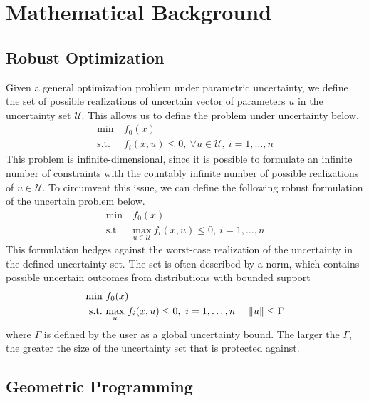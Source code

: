 \section{Mathematical Background}

\subsection{Robust Optimization}

Given a general optimization problem under parametric uncertainty, we define the set of possible
realizations of uncertain vector of parameters $u$ in the uncertainty set $\mathcal{U}$. This
allows us to define the problem under uncertainty below.
\begin{align*}
    \text{min} &~f_0(x) \\
    \text{s.t.}     &~f_i(x,u) \leq 0,~\forall u \in \mathcal{U},~i = 1,\ldots,n
\end{align*}
This problem is infinite-dimensional, since it is possible to formulate an infinite number of constraints
with the countably infinite number of possible realizations of $u \in \mathcal{U}$. To circumvent this issue,
we can define the following robust formulation of the uncertain problem below.
\begin{align*}
    \text{min} &~f_0(x) \\
    \text{s.t.}     &~\underset{u \in \mathcal{U}}{\text{max}}~f_i(x,u) \leq 0,~i = 1,\ldots,n
\end{align*}
This formulation hedges against the worst-case realization of the uncertainty in the defined uncertainty
set. The set is often described by a norm, which contains possible uncertain outcomes from distributions with
bounded support
\begin{equation}
\begin{aligned}
    \text{min} &~f_0(x) \\
    \text{s.t.}     &~\underset{u}{\text{max}}~f_i(x,u) \leq 0,~i = 1,\ldots,n
                    &~\left\lVert u\right\rVert \leq \Gamma \\
\end{aligned}
        \label{eq:normform}
\end{equation}
where $\Gamma$ is defined by the user as a global uncertainty bound. The larger the $\Gamma$,
the greater the size of the uncertainty set that is protected against.

\subsection{Geometric Programming}

